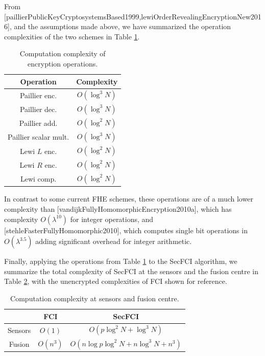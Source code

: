 From [paillierPublicKeyCryptosystemsBased1999,lewiOrderRevealingEncryptionNew2016], and the assumptions made above, we have summarized the operation complexities of the two schemes in Table \ref{tab:complex_ops}.
\begin{table}[tb]
   \centering
   \caption{Computation complexity of encryption operations.}
   \label{tab:complex_ops}
   \begin{tabular}{ |c|c| }
      \hline
      \textbf{Operation} & \textbf{Complexity} \\ 
      \hline
      Paillier enc. & $O(\log^3{N})$ \\ 
      Paillier dec. & $O(\log^3{N})$ \\ 
      Paillier add. & $O(\log^2{N})$ \\ 
      Paillier scalar mult. & $O(\log^3{N})$ \\ 
      Lewi $L$ enc. & $O(\log^2{N})$ \\ 
      Lewi $R$ enc. & $O(\log^2{N})$ \\ 
      Lewi comp. & $O(\log^2{N})$ \\ 
      \hline
   \end{tabular}
\end{table}
In contrast to some current FHE schemes, these operations are of a much lower complexity than [vandijkFullyHomomorphicEncryption2010a], which has complexity $O(\lambda^{10})$ for integer operations, and [stehleFasterFullyHomomorphic2010], which computes single bit operations in $O(\lambda^{3.5})$ adding significant overhead for integer arithmetic.

Finally, applying the operations from Table \ref{tab:complex_ops} to the SecFCI algorithm, we summarize the total complexity of SecFCI at the sensors and the fusion centre in Table \ref{tab:complex}, with the unencrypted complexities of FCI shown for reference. 
\begin{table}[tb]
   \centering
   \caption{Computation complexity at sensors and fusion centre.}
   \label{tab:complex}
   \begin{tabular}{ |c|c|c| }
      \hline
       & \textbf{FCI} & \textbf{SecFCI} \\ 
      \hline
      Sensors & $O(1)$ & $O\left(p\log^2{N} + \log^3{N}\right)$ \\ 
      Fusion & $O(n^3)$ & $O\left(n\log{p}\log^2{N} + n\log^3{N} + n^3\right)$ \\ 
      \hline
   \end{tabular}
\end{table}

